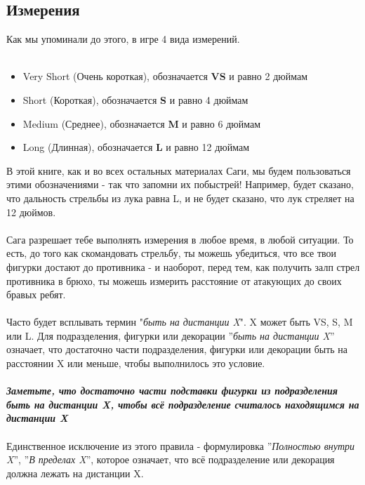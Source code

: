 \documentclass[a4paper,11pt,twoside]{article}
\begin{document}
\subsection*{Измерения}

Как мы упоминали до этого, в игре 4 вида измерений. \\ \\

\begin{itemize}
\item Very Short (Очень короткая), обозначается \textbf{VS} и равно 2 дюймам
\item Short (Короткая), обозначается \textbf{S} и равно 4 дюймам
\item Medium (Среднее), обозначается \textbf{M} и равно 6 дюймам
\item Long (Длинная), обозначается \textbf{L} и равно 12 дюймам 
\end{itemize} 

В этой книге, как и во всех остальных материалах Саги, мы будем пользоваться этими обозначениями - так что запомни их побыстрей! Например, будет сказано, что дальность стрельбы из лука равна L, и не будет сказано, что лук стреляет на 12 дюймов.
\\ \\ 
Сага разрешает тебе выполнять измерения в любое время, в любой ситуации. То есть, до того как скомандовать стрельбу, ты можешь убедиться, что все твои фигурки достают до противника - и наоборот, перед тем, как получить залп стрел противника в брюхо, ты можешь измерить расстояние от атакующих до своих бравых ребят. \\ \\ 
Часто будет всплывать термин "\textit{быть на дистанции X}". X может быть VS, S, M или L. Для подразделения, фигурки или декорации ''\textit{быть на дистанции X}'' означает, что достаточно части подразделения, фигурки или декорации быть на расстоянии X или меньше, чтобы выполнилось это условие. \\ \\ 
\textit{\textbf{Заметьте, что достаточно части подставки фигурки из подразделения быть на дистанции X, чтобы всё подразделение считалось находящимся на дистанции X}} \\ \\
Единственное исключение из этого правила - формулировка ''\textit{Полностью внутри X}'', ''\textit{В пределах X}'', которое означает, что всё подразделение или декорация должна лежать на дистанции X. \\ \\ 
\end{document}
